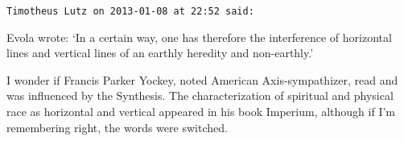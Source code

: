 \begin{footnotesize}
\begin{sffamily}
\hfill

\texttt{Timotheus Lutz on 2013-01-08 at 22:52 said:}

Evola wrote: `In a certain way, one has therefore the interference of horizontal lines and vertical lines of an earthly heredity and non-earthly.'

I wonder if Francis Parker Yockey, noted American Axis-sympathizer, read and was influenced by the Synthesis. The characterization of spiritual and physical race as horizontal and vertical appeared in his book Imperium, although if I'm remembering right, the words were switched.

\end{sffamily}
\end{footnotesize}

